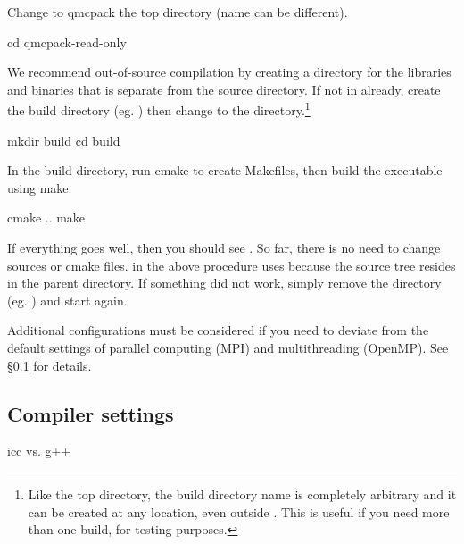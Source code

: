 Change to qmcpack the top directory (name can be different).
\begin{lstcnsl}
cd qmcpack-read-only
\end{lstcnsl}
We recommend out-of-source compilation by creating a directory for the libraries and binaries that is separate from the source directory.  If not in  already, create the build directory (eg. ) then change to the directory.\footnote{Like the top directory, the build directory name is completely arbitrary and it can be created at any location, even outside .  This is useful if you need more than one build, for testing purposes.}
\begin{lstcnsl}
mkdir build
cd build
\end{lstcnsl}
In the build directory, run cmake to create Makefiles, then build the executable using make.
\begin{lstcnsl}
cmake ..
make
\end{lstcnsl}
If everything goes well, then you should see .
%
So far, there is no need to change sources or cmake files.   in the above procedure uses  because the source tree resides in the parent directory.  If something did not work, simply remove the directory (eg. ) and start again. 

Additional configurations must be considered if you need to deviate from the default settings of parallel computing (MPI) and multithreading (OpenMP).  See \S{}\ref{ss:compset} for details.

\subsection{Compiler settings} \label{ss:compset}
icc vs. g++

